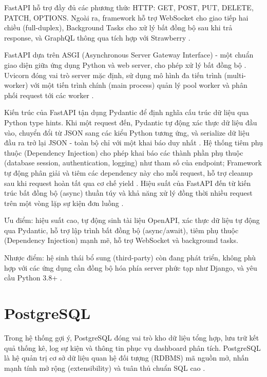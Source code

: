 \documentclass[../BTL.tex]{subfiles}
\begin{document}
FastAPI hỗ trợ đầy đủ các phương thức HTTP: GET, POST, PUT, DELETE, PATCH, OPTIONS. Ngoài ra, framework hỗ trợ WebSocket cho giao tiếp hai chiều (full-duplex), Background Tasks cho xử lý bất đồng bộ sau khi trả response, và GraphQL thông qua tích hợp với Strawberry \cite{fastapi_official,fastapi_wikipedia}.

FastAPI dựa trên ASGI (Asynchronous Server Gateway Interface) - một chuẩn giao diện giữa ứng dụng Python và web server, cho phép xử lý bất đồng bộ \cite{fastapi_wikipedia}. Uvicorn đóng vai trò server mặc định, sử dụng mô hình đa tiến trình (multi-worker) với một tiến trình chính (main process) quản lý pool worker và phân phối request tới các worker \cite{fastapi_wikipedia}.

Kiến trúc của FastAPI tận dụng Pydantic để định nghĩa cấu trúc dữ liệu qua Python type hints. Khi một request đến, Pydantic tự động xác thực dữ liệu đầu vào, chuyển đổi từ JSON sang các kiểu Python tương ứng, và serialize dữ liệu đầu ra trở lại JSON - toàn bộ chỉ với một khai báo duy nhất \cite{fastapi_official}. Hệ thống tiêm phụ thuộc (Dependency Injection) cho phép khai báo các thành phần phụ thuộc (database session, authentication, logging) như tham số của endpoint; Framework tự động phân giải và tiêm các dependency này cho mỗi request, hỗ trợ cleanup sau khi request hoàn tất qua cơ chế yield \cite{fastapi_official,fastapi_wikipedia}. Hiệu suất của FastAPI đến từ kiến trúc bất đồng bộ (async) thuần túy và khả năng xử lý đồng thời nhiều request trên một vòng lặp sự kiện đơn luồng \cite{fastapi_wikipedia}.

Ưu điểm: hiệu suất cao, tự động sinh tài liệu OpenAPI, xác thực dữ liệu tự động qua Pydantic, hỗ trợ lập trình bất đồng bộ (async/await), tiêm phụ thuộc (Dependency Injection) mạnh mẽ, hỗ trợ WebSocket và background tasks.

Nhược điểm: hệ sinh thái bổ sung (third-party) còn đang phát triển, không phù hợp với các ứng dụng cần đồng bộ hóa phía server phức tạp như Django, và yêu cầu Python 3.8+ \cite{fastapi_official}.


\section{PostgreSQL}
Trong hệ thống gợi ý, PostgreSQL đóng vai trò kho dữ liệu tổng hợp, lưu trữ kết quả thống kê, log sự kiện và thông tin phục vụ dashboard phân tích. PostgreSQL là hệ quản trị cơ sở dữ liệu quan hệ đối tượng (RDBMS) mã nguồn mở, nhấn mạnh tính mở rộng (extensibility) và tuân thủ chuẩn SQL cao \cite{postgresql_wikipedia}.
\end{document}
